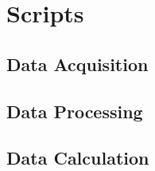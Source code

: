 \documentclass{article}
\begin{document}
\appendix

\section{Scripts}
\subsection{Data Acquisition}
\begin{center}
	\parbox{.85\textwidth}{
	}
\end{center}

\subsection{Data Processing}
\begin{center}
	\parbox{.85\textwidth}{
	}
\end{center}

\subsection{Data Calculation}
\begin{center}
	\parbox{.85\textwidth}{
	}
\end{center}
\end{document}

